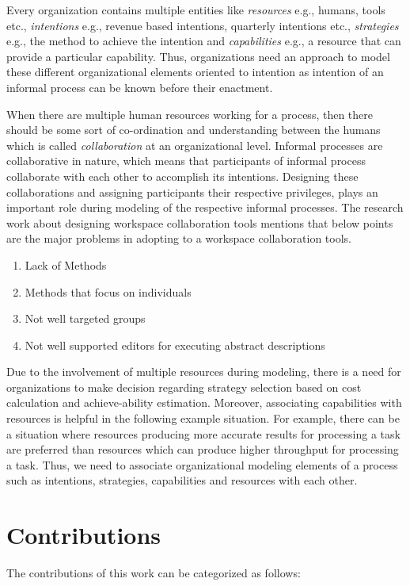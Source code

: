 Every organization contains multiple entities like \textit{resources} e.g., humans, tools etc., \textit{intentions} e.g., revenue based intentions, quarterly intentions etc., \textit{strategies} e.g., the method to achieve the intention and \textit{capabilities} e.g., a resource that can provide a particular capability. Thus, organizations need an approach to model these different organizational elements oriented to intention as intention of an informal process can be known before their enactment.

When there are multiple human resources working for a process, then there should be some sort of co-ordination and understanding between the humans which is called \textit{collaboration} at an organizational level. Informal processes are collaborative in nature, which means that participants of informal process collaborate with each other to accomplish its intentions\cite{Sungur2015}. Designing these collaborations and assigning participants their respective privileges, plays an important role during modeling of the respective informal processes. The research work about designing workspace collaboration tools \cite{Matthews2011} mentions that below points are the major problems in adopting to a workspace collaboration tools.

\begin{enumerate}
	\item Lack of Methods
	\item Methods that focus on individuals
	\item Not well targeted groups
	\item Not well supported editors for executing abstract descriptions
\end{enumerate}

Due to the involvement of multiple resources during modeling, there is a need for organizations to make decision regarding strategy selection based on cost calculation and achieve-ability estimation.  Moreover, associating capabilities with resources is helpful in the following example situation. For example, there can be a situation where resources producing more accurate results for processing a task are preferred than resources which can produce higher throughput for processing a task. Thus, we need to associate organizational modeling elements of a process such as intentions, strategies, capabilities and resources with each other. 

\section {Contributions}
\label{sec:researchobjectives}
The contributions of this work can be categorized as follows:

